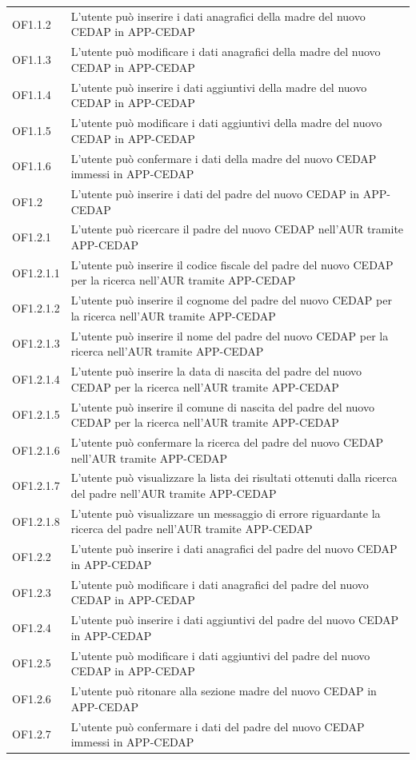\documentclass[a4paper]{article}
\begin{document}
\begin{longtable}{|l|p{10cm}|}
OF1.1.2 & L'utente può inserire i dati anagrafici della madre del nuovo CEDAP in APP-CEDAP \\
OF1.1.3 & L'utente può modificare i dati anagrafici della madre del nuovo CEDAP in APP-CEDAP \\
OF1.1.4 & L'utente può inserire i dati aggiuntivi della madre del nuovo CEDAP in APP-CEDAP \\
OF1.1.5 & L'utente può modificare i dati aggiuntivi della madre del nuovo CEDAP in APP-CEDAP \\
OF1.1.6 & L'utente può confermare i dati della madre del nuovo CEDAP immessi in APP-CEDAP \\

OF1.2 & L'utente può inserire i dati del padre del nuovo CEDAP in APP-CEDAP \\

OF1.2.1 & L'utente può ricercare il padre del nuovo CEDAP nell'AUR tramite APP-CEDAP \\

OF1.2.1.1 & L'utente può inserire il codice fiscale del padre del nuovo CEDAP per la ricerca nell'AUR tramite APP-CEDAP \\
OF1.2.1.2 & L'utente può inserire il cognome del padre del nuovo CEDAP per la ricerca nell'AUR tramite APP-CEDAP \\
OF1.2.1.3 & L'utente può inserire il nome del padre del nuovo CEDAP per la ricerca nell'AUR tramite APP-CEDAP \\
OF1.2.1.4 & L'utente può inserire la data di nascita del padre del nuovo CEDAP per la ricerca nell'AUR tramite APP-CEDAP \\
OF1.2.1.5 & L'utente può inserire il comune di nascita del padre del nuovo CEDAP per la ricerca nell'AUR tramite APP-CEDAP \\
OF1.2.1.6 & L'utente può confermare la ricerca del padre del nuovo CEDAP nell'AUR tramite APP-CEDAP \\
OF1.2.1.7 & L'utente può visualizzare la lista dei risultati ottenuti dalla ricerca del padre nell'AUR tramite APP-CEDAP \\
OF1.2.1.8 & L'utente può visualizzare un messaggio di errore riguardante la ricerca del padre nell'AUR tramite APP-CEDAP \\

OF1.2.2 & L'utente può inserire i dati anagrafici del padre del nuovo CEDAP in APP-CEDAP \\
OF1.2.3 & L'utente può modificare i dati anagrafici del padre del nuovo CEDAP in APP-CEDAP \\
OF1.2.4 & L'utente può inserire i dati aggiuntivi del padre del nuovo CEDAP in APP-CEDAP \\
OF1.2.5 & L'utente può modificare i dati aggiuntivi del padre del nuovo CEDAP in APP-CEDAP \\
OF1.2.6 & L'utente può ritonare alla sezione madre del nuovo CEDAP in APP-CEDAP \\
OF1.2.7 & L'utente può confermare i dati del padre del nuovo CEDAP immessi in APP-CEDAP \\


\end{longtable}
\end{document}

